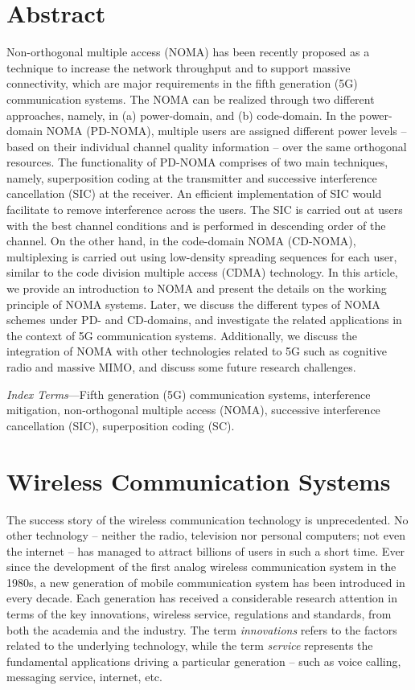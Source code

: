 \begin{multicols}{2}

\section*{Abstract}

Non-orthogonal multiple access (NOMA) has been recently proposed as a technique to increase the network throughput and to support massive connectivity, which are major requirements in the fifth generation (5G) communication systems. The NOMA can be realized through two different approaches, namely, in (a) power-domain, and (b) code-domain. In the power-domain NOMA (PD-NOMA), multiple users are assigned different power levels -- based on their individual channel quality information -- over the same orthogonal resources. The functionality of PD-NOMA comprises of two main techniques, namely, superposition coding at the transmitter and successive interference cancellation (SIC) at the receiver. An efficient implementation of SIC would facilitate to remove interference across the users. The SIC is carried out at users with the best channel conditions and is performed in descending order of the channel. On the other hand, in the code-domain NOMA (CD-NOMA), multiplexing is carried out using low-density spreading sequences for each user, similar to the code division multiple access (CDMA) technology. In this article, we provide an introduction to NOMA and present the details on the working principle of NOMA systems. Later, we discuss the different types of NOMA schemes under PD- and CD-domains, and investigate the related applications in the context of 5G communication systems. Additionally, we discuss the integration of NOMA with other technologies related to 5G such as cognitive radio and massive MIMO, and discuss some future research challenges.



\textit{Index Terms}---Fifth generation (5G) communication systems, interference mitigation, non-orthogonal multiple access (NOMA), successive interference cancellation (SIC), superposition coding (SC).


\section{Wireless Communication Systems}

The success story of the wireless communication technology is unprecedented. No other technology -- neither the radio, television nor personal computers; not even the internet -- has managed to attract billions of users in such a short time. Ever since the development of the first analog wireless communication system in the 1980s, a new generation of mobile communication system has been introduced in every decade. Each generation has received a considerable research attention in terms of the key innovations, wireless service, regulations and standards, from both the academia and the industry. The term \emph{innovations} refers to the factors related to the underlying technology, while the term \emph{service} represents the fundamental applications driving a particular generation -- such as voice calling, messaging service, internet, etc.


\end{multicols}
